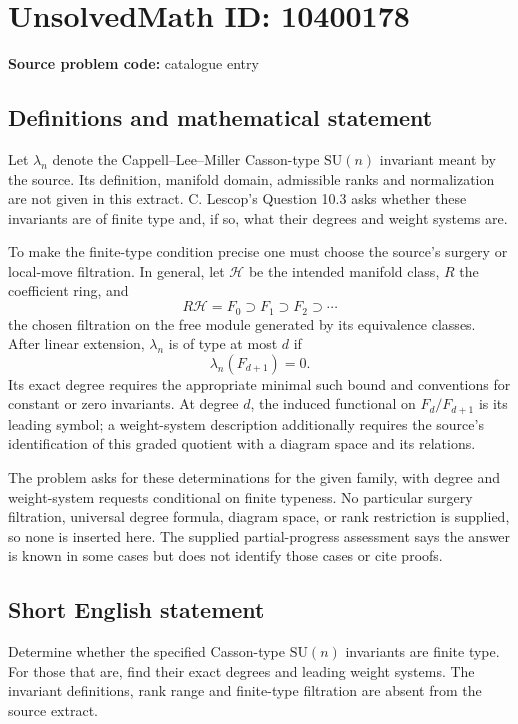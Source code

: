\documentclass[11pt]{article}
\begin{document}
\section*{UnsolvedMath ID: 10400178}
\textbf{Source problem code:} catalogue entry
\subsection{Definitions and mathematical statement}
Let \(\lambda_n\) denote the Cappell--Lee--Miller Casson-type \(\mathrm{SU}(n)\) invariant meant by the source. Its definition, manifold domain, admissible ranks and normalization are not given in this extract. C. Lescop's Question 10.3 asks whether these invariants are of finite type and, if so, what their degrees and weight systems are.

To make the finite-type condition precise one must choose the source's surgery or local-move filtration. In general, let \(\mathcal H\) be the intended manifold class, \(R\) the coefficient ring, and
\[
 R\mathcal H=F_0\supset F_1\supset F_2\supset\cdots
\]
the chosen filtration on the free module generated by its equivalence classes. After linear extension, \(\lambda_n\) is of type at most \(d\) if
\[
 \lambda_n(F_{d+1})=0.
\]
Its exact degree requires the appropriate minimal such bound and conventions for constant or zero invariants. At degree \(d\), the induced functional on \(F_d/F_{d+1}\) is its leading symbol; a weight-system description additionally requires the source's identification of this graded quotient with a diagram space and its relations.

The problem asks for these determinations for the given family, with degree and weight-system requests conditional on finite typeness. No particular surgery filtration, universal degree formula, diagram space, or rank restriction is supplied, so none is inserted here. The supplied partial-progress assessment says the answer is known in some cases but does not identify those cases or cite proofs.
\subsection{Short English statement}
Determine whether the specified Casson-type \(\mathrm{SU}(n)\) invariants are finite type. For those that are, find their exact degrees and leading weight systems. The invariant definitions, rank range and finite-type filtration are absent from the source extract.
\end{document}
